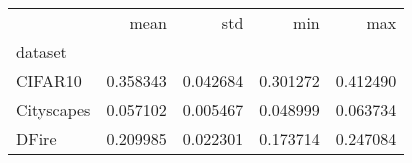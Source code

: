 \begin{tabular}{lrrrr}
\toprule
 & mean & std & min & max \\
dataset &  &  &  &  \\
\midrule
CIFAR10 & 0.358343 & 0.042684 & 0.301272 & 0.412490 \\
Cityscapes & 0.057102 & 0.005467 & 0.048999 & 0.063734 \\
DFire & 0.209985 & 0.022301 & 0.173714 & 0.247084 \\
\bottomrule
\end{tabular}
